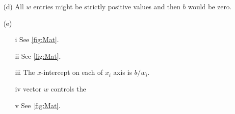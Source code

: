 \documentclass[12pt]{article}
\begin{document}
(d) All $w$ entries might be strictly positive values and then $b$ would be zero. 


\vspace{0.2 in}

(e) \begin{itemize}
\item[i] See \ref{fig:Mat}.
\item[ii] See \ref{fig:Mat}.
\item[iii] The $x$-intercept on each of $x_i$ axis is $b/w_i$.
\item[iv] vector $w$ controls the 
\item[v] See \ref{fig:Mat}.
\end{itemize}

\end{document}
